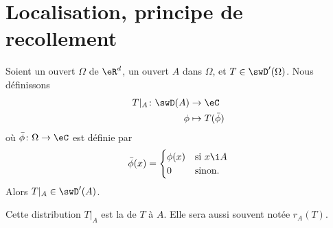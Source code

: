 \section{Localisation, principe de recollement}

\begin{propositionDef}     \label{PROPooNCHIooNOPfBt}
    Soient un ouvert \( \Omega\) de \( \eR^d\), un ouvert \( A\) dans \( \Omega\), et \( T\in\swD'(\Omega)\). Nous définissons
    \begin{equation}
        \begin{aligned}
            T|_A\colon \swD(A)&\to \eC \\
             \phi  &\mapsto T(\bar \phi) 
        \end{aligned}
    \end{equation}
    où  \(\bar \phi\colon \Omega\to \eC\) est définie par
    \begin{equation}
        \bar\phi(x)=\begin{cases}
            \phi(x)    &   \text{si }  x\i A\\
            0    &    \text{sinon. }
        \end{cases}
    \end{equation}
    Alors \( T|_A\in \swD'(A)\).

    Cette distribution \( T|_A\) est la  de \( T\) à \( A\). Elle sera aussi souvent notée \( r_A(T)\).
\end{propositionDef}


